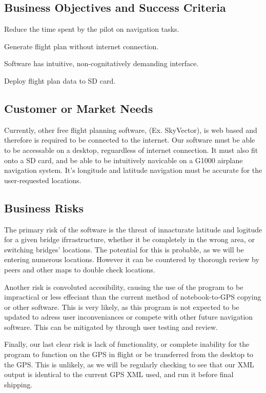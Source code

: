 \documentclass[12pt, letterpaper]{article}
\begin{document}
\subsection{Business Objectives and Success Criteria}
Reduce the time spent by the pilot on navigation tasks.

Generate flight plan without internet connection.

Software has intuitive, non-cognitatively demanding interface.

Deploy flight plan data to SD card.

\subsection{Customer or Market Needs}
Currently, other free flight planning software, (Ex. SkyVector), is web based and therefore is required to be connected to the internet. Our software must be able to be accessable on a desktop, reguardless of internet connection. It must also fit onto a SD card, and be able to be intuitively navicable on a G1000 airplane navigation system. It's longitude and latitude navigation must be accurate for the user-requested locations. 
\subsection{Business Risks}
The primary risk of the software is the threat of innacturate latitude and logitude for a given bridge ifrrastructure, whether it be completely in the wrong area, or switching bridges' locations. The potential for this is probable, as we will be entering numerous locations. However it can be countered by thorough review by peers and other maps to double check locations.

Another risk is convoluted accesibility, causing the use of the program to be impractical or less effeciant than the current method of notebook-to-GPS copying or other software. This is very likely, as this program is not expected to be updated to adress user inconveniances or compete with other future navigation software. This can be mitigated by through user testing and review. 

Finally, our last clear risk is lack of functionality, or complete inability for the program to function on the GPS in flight or be transferred from the desktop to the GPS. This is unlikely, as we will be regularly checking to see that our XML output is identical to the current GPS XML used, and run it before final shipping. 
\end{document}
